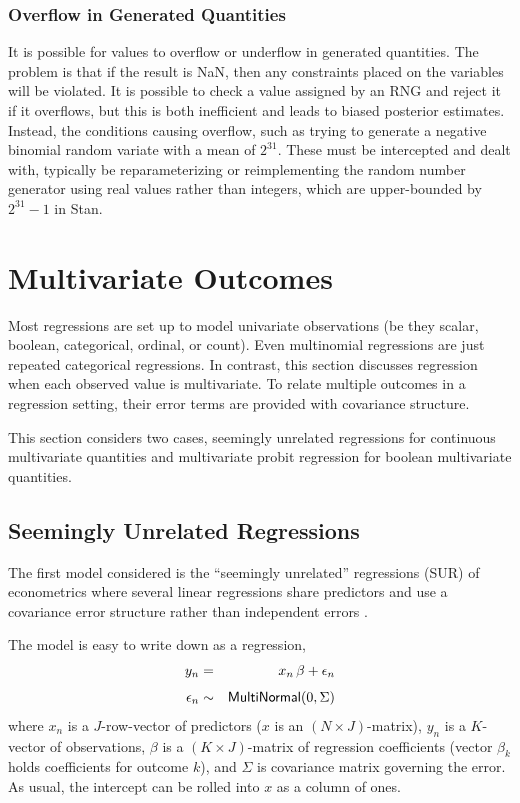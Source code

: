 \subsubsection{Overflow in Generated Quantities}

It is possible for values to overflow or underflow in generated
quantities.  The problem is that if the result is NaN, then any
constraints placed on the variables will be violated.  It is possible
to check a value assigned by an RNG and reject it if it overflows, but
this is both inefficient and leads to biased posterior estimates.
Instead, the conditions causing overflow, such as trying to generate a
negative binomial random variate with a mean of $2^{31}$.  These must
be intercepted and dealt with, typically be reparameterizing or
reimplementing the random number generator using real values rather
than integers, which are upper-bounded by $2^{31} - 1$ in Stan.


\section{Multivariate Outcomes}

Most regressions are set up to model univariate observations (be they
scalar, boolean, categorical, ordinal, or count).  Even multinomial
regressions are just repeated categorical regressions.  In contrast,
this section discusses regression when each observed value is
multivariate.  To relate multiple outcomes in a regression setting,
their error terms are provided with covariance structure.

This section considers two cases, seemingly unrelated regressions for
continuous multivariate quantities and multivariate probit regression
for boolean multivariate quantities.

\subsection{Seemingly Unrelated Regressions}

The first model considered is the ``seemingly unrelated'' regressions
(SUR) of econometrics where several linear regressions share
predictors and use a covariance error structure rather than
independent errors \citep{Zellner:1962,Greene:2011}.

The model is easy to write down as a regression,
%
\begin{eqnarray*}
 y_n & = & x_n \, \beta + \epsilon_n
\\[4pt]
 \epsilon_n & \sim & \mbox{\sf MultiNormal}(0, \Sigma)
\end{eqnarray*}
%
where $x_n$ is a $J$-row-vector of predictors ($x$ is an $(N \times
J)$-matrix), $y_n$ is a $K$-vector of observations, $\beta$ is a $(K
\times J)$-matrix of regression coefficients (vector $\beta_k$ holds
coefficients for outcome $k$), and $\Sigma$ is covariance matrix
governing the error.  As usual, the intercept can be rolled into $x$
as a column of ones.

